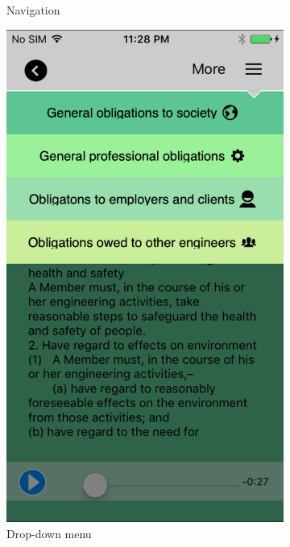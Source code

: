 \begin{figure}[!hbt]
\begin{subfigure}{0.3\textwidth}
\caption{Navigation}
    \end{subfigure}\hspace{0.02\textwidth}
 \begin{subfigure}{0.3\textwidth}
\includegraphics[width=\textwidth]{menu}
\caption{Drop-down menu}
 \end{subfigure}\hspace{0.02\textwidth}
 \begin{subfigure}{0.335\textwidth}

\end{subfigure}
\end{figure}
